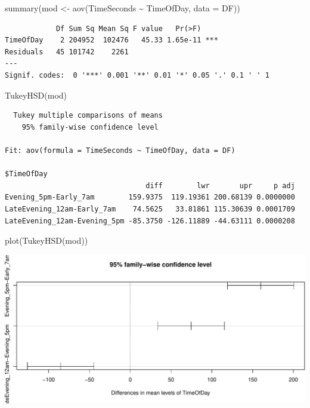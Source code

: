 \documentclass[
]{article}
\newenvironment{Shaded}{\begin{snugshade}}{\end{snugshade}}
\newcommand{\AttributeTok}[1]{\textcolor[rgb]{0.77,0.63,0.00}{#1}}
\newcommand{\FunctionTok}[1]{\textcolor[rgb]{0.00,0.00,0.00}{#1}}
\newcommand{\NormalTok}[1]{#1}
\newcommand{\OtherTok}[1]{\textcolor[rgb]{0.56,0.35,0.01}{#1}}
\newcommand{\SpecialCharTok}[1]{\textcolor[rgb]{0.00,0.00,0.00}{#1}}
\begin{document}
\begin{Shaded}
\begin{Highlighting}[]
\FunctionTok{summary}\NormalTok{(mod }\OtherTok{\textless{}{-}} \FunctionTok{aov}\NormalTok{(TimeSeconds }\SpecialCharTok{\textasciitilde{}}\NormalTok{ TimeOfDay, }\AttributeTok{data =}\NormalTok{ DF))}
\end{Highlighting}
\end{Shaded}

\begin{verbatim}
            Df Sum Sq Mean Sq F value   Pr(>F)    
TimeOfDay    2 204952  102476   45.33 1.65e-11 ***
Residuals   45 101742    2261                     
---
Signif. codes:  0 '***' 0.001 '**' 0.01 '*' 0.05 '.' 0.1 ' ' 1
\end{verbatim}

\begin{Shaded}
\begin{Highlighting}[]
\FunctionTok{TukeyHSD}\NormalTok{(mod)}
\end{Highlighting}
\end{Shaded}

\begin{verbatim}
  Tukey multiple comparisons of means
    95% family-wise confidence level

Fit: aov(formula = TimeSeconds ~ TimeOfDay, data = DF)

$TimeOfDay
                                 diff        lwr       upr     p adj
Evening_5pm-Early_7am        159.9375  119.19361 200.68139 0.0000000
LateEvening_12am-Early_7am    74.5625   33.81861 115.30639 0.0001709
LateEvening_12am-Evening_5pm -85.3750 -126.11889 -44.63111 0.0000208
\end{verbatim}

\begin{Shaded}
\begin{Highlighting}[]
\FunctionTok{plot}\NormalTok{(}\FunctionTok{TukeyHSD}\NormalTok{(mod))}
\end{Highlighting}
\end{Shaded}

\begin{center}\includegraphics{SDM-CHAP25_files/figure-latex/unnamed-chunk-3-1} \end{center}
\end{document}

